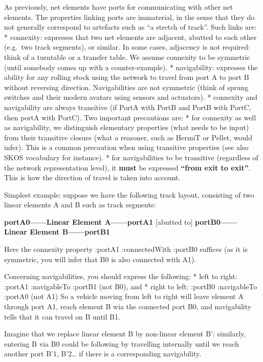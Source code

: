 \documentclass[
  11pt,
]{article}
\begin{document}
As previously, net elements have ports for communicating with other net
elements. The properties linking ports are immaterial, in the sense that
they do not generally correspond to artefacts such as ``a stretch of
track''. Such links are: * connexity: expresses that two net elements
are adjacent, abutted to each other (e.g.~two track segments), or
similar. In some cases, adjacency is not required: think of a turntable
or a transfer table. We assume connexity to be symmetric (until somebody
comes up with a counter-example). * navigability: expresses the ability
for any rolling stock using the network to travel from port A to port B
without reversing direction. Navigabilities are not symmetric (think of
sprung switches and their modern avatars using sensors and actuators). *
connexity and navigability are always transitive (if PortA with PortB
and PortB with PortC, then portA with PortC). Two important precautions
are: * for connexity as well as navigability, we distinguish elementary
properties (what needs to be input) from their transitive closure (what
a reasoner, such as HermiT or Pellet, would infer). This is a common
precaution when using transitive properties (see also SKOS vocabulary
for instance). * for navigabilities to be transitive (regardless of the
network representation level), it \textbf{must} be expressed
\textbf{``from exit to exit''}. This is how the direction of travel is
taken into account.

Simplest example: suppose we have the following track layout, consisting
of two linear elements A and B such as track segments:

\textbf{portA0------Linear Element A------portA1} {[}abutted to{]}
\textbf{portB0------ Linear Element B------portB1}

Here the connexity property :portA1 :connectedWith :portB0 suffices (as
it is symmetric, you will infer that B0 is also connected with A1).

Concerning navigabilities, you should express the following: * left to
right: :portA1 :navigableTo :portB1 (not B0), and * right to left:
:portB0 :navigableTo :portA0 (not A1) So a vehicle moving from left to
right will leave element A through port A1, reach element B wia the
connected port B0, and navigability tells that it can travel on B until
B1.

Imagine that we replace linear element B by non-linear element B':
similarly, entering B via B0 could be following by travelling internally
until we reach another port B'1, B'2\ldots{} if there is a corresponding
navigability.
\end{document}
